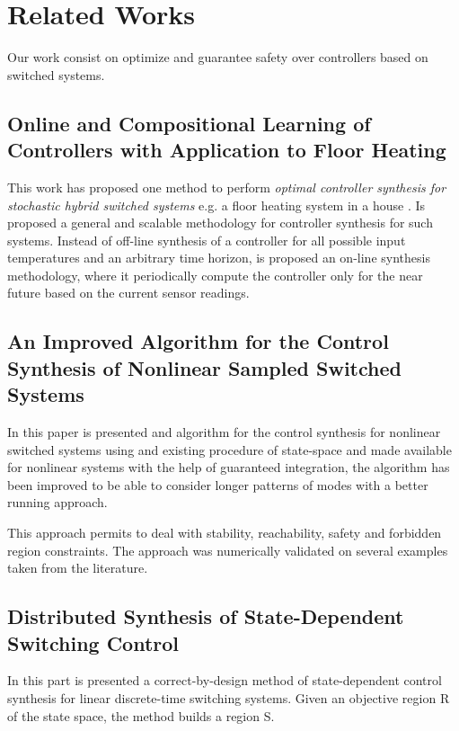 
\chapter{Related Works}
Our work consist on optimize and guarantee safety over controllers
based on switched systems.

\section{Online and Compositional Learning of Controllers with Application to Floor Heating}
This work has proposed one method to perform 
\textit{optimal controller synthesis for stochastic hybrid switched systems} e.g. a 
floor heating system in a house \cite{larsen2016online}. Is proposed a general
 and scalable methodology for controller synthesis for such systems. Instead of
  off-line synthesis of a controller for all possible input temperatures and an
   arbitrary time horizon, is proposed an on-line synthesis methodology, where 
   it periodically compute the controller only for the near future based on the
    current sensor readings.

\section{An Improved Algorithm for the Control Synthesis
of Nonlinear Sampled Switched Systems}
In this paper is presented and algorithm for the control synthesis for
 nonlinear switched systems using and existing procedure of state-space 
 and made available for nonlinear systems with the help of guaranteed 
 integration, the algorithm has been improved to be able to consider longer 
 patterns of modes with a better running approach. 

This approach permits to deal with stability, reachability, 
safety and forbidden region constraints. The approach was numerically validated
 on several examples taken from the literature.\cite{le2017improved}


\section{Distributed Synthesis of State-Dependent
Switching Control}
In this part is presented a correct-by-design method of state-dependent control
 synthesis for linear discrete-time switching systems. Given an objective region 
 R of the state space, the method builds a region S. \cite{le2016distributed}

